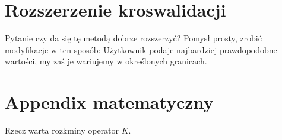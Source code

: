 \documentclass[9pt]{article}
\begin{document}
\section{Rozszerzenie kroswalidacji}
Pytanie czy da się tę metodą dobrze rozszerzyć?
Pomysł prosty, zrobić modyfikacje w ten sposób:
Użytkownik podaje najbardziej prawdopodobne wartości, my zaś je wariujemy w
określonych granicach.


\section{Appendix matematyczny}
Rzecz warta rozkminy operator $K$.

%
%
\end{document}
